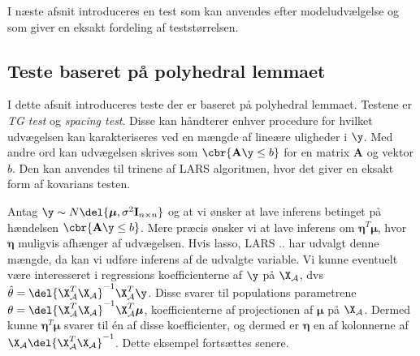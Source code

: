 I næste afsnit introduceres en test som kan anvendes efter modeludvælgelse og som giver en eksakt fordeling af teststørrelsen.

\newpage
\subsection{Teste baseret på polyhedral lemmaet}
\citep{post_inference}


I dette afsnit introduceres teste der er baseret på polyhedral lemmaet.
Testene er \textit{TG test} og \textit{spacing test}. 
Disse kan håndterer enhver procedure for hvilket udvægelsen kan karakteriseres ved en mængde af lineære uligheder i \(\y\).
Med andre ord kan udvægelsen skrives som \(\cbr{\mathbf{A} \y \leq b}\) for en matrix \(\mathbf{A}\) og vektor \(b\).
Den kan anvendes til trinene af LARS algoritmen, hvor det giver en eksakt form af kovarians testen.

Antag \(\y \sim N\del{\boldsymbol{\mu}, \sigma^2 \mathbf{I}_{n \times n}}\) og at vi ønsker at lave inferens betinget på hændelsen \(\cbr{\mathbf{A} \y \leq b}\).
Mere præcis ønsker vi at lave inferens om \(\boldsymbol{\eta}^T \boldsymbol{\mu}\), hvor \(\boldsymbol{\eta}\) muligvis afhænger af udvægelsen.
Hvis lasso, LARS .. har udvalgt denne mængde, da kan vi udføre inferens  af de udvalgte variable.
Vi kunne eventuelt være interesseret i regressions koefficienterne af \(\y\) på \(\X_\mathcal{A}\), dvs \(\hat{\theta}= \del{\X_\mathcal{A}^T \X_\mathcal{A}}^{-1} \X_\mathcal{A}^T \y\).
Disse svarer til populations parametrene \(\theta= \del{\X_\mathcal{A}^T \X_\mathcal{A}}^{-1} \X_\mathcal{A}^T \boldsymbol{\mu}\), koefficienterne af projectionen af \(\boldsymbol{\mu}\) på \(\X_\mathcal{A}\).
Dermed kunne \(\boldsymbol{\eta}^T \boldsymbol{\mu}\) svarer til én af disse koefficienter, og dermed er \(\boldsymbol{\eta}\) en af kolonnerne af \(\X_\mathcal{A} \del{\X_\mathcal{A}^T \X_\mathcal{A}}^{-1}\). Dette eksempel fortsættes senere.


